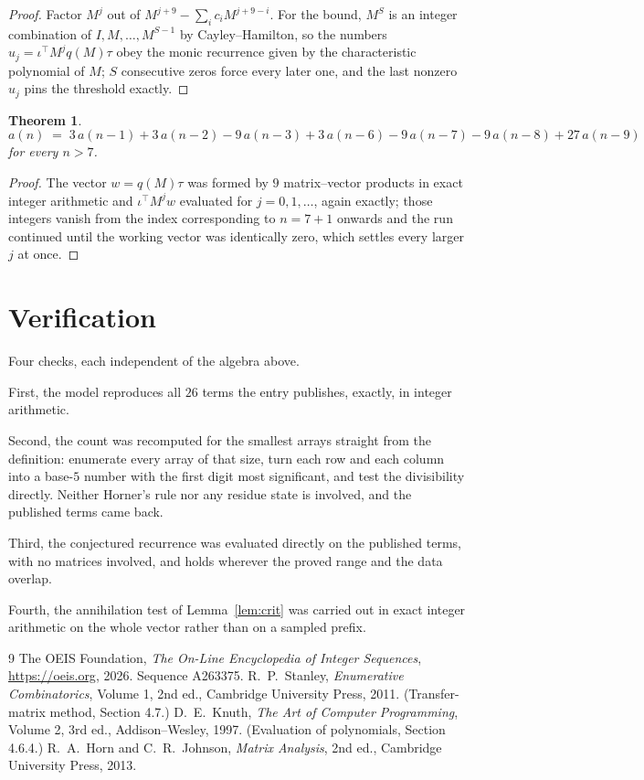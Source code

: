 \documentclass[11pt,a4paper]{article}
\theoremstyle{plain}
\newtheorem{theorem}{Theorem}
\theoremstyle{definition}
\begin{document}
\begin{proof}
Factor $M^{j}$ out of $M^{j+9}-\sum_ic_iM^{j+9-i}$. For the bound, $M^{S}$
is an integer combination of $I,M,\dots,M^{S-1}$ by Cayley--Hamilton, so the numbers
$u_j=\iota^{\!\top}M^{j}q(M)\tau$ obey the monic recurrence given by the characteristic
polynomial of $M$; $S$ consecutive zeros force every later one, and the last nonzero $u_j$
pins the threshold exactly.
\end{proof}

\begin{theorem}
\[
a(n)\;=\;3\,a(n-1) + 3\,a(n-2) - 9\,a(n-3) + 3\,a(n-6) - 9\,a(n-7) - 9\,a(n-8) + 27\,a(n-9)
\]
for every $n>7$.
\end{theorem}

\begin{proof}
The vector $w=q(M)\tau$ was formed by $9$ matrix--vector products in exact integer
arithmetic and $\iota^{\!\top}M^{j}w$ evaluated for $j=0,1,\dots$, again exactly; those
integers vanish from the index corresponding to $n=7+1$ onwards and the run continued
until the working vector was identically zero, which settles every larger $j$ at once.
\end{proof}

\section{Verification}

Four checks, each independent of the algebra above.

First, the model reproduces all $26$ terms the entry publishes, exactly, in integer
arithmetic.

Second, the count was recomputed for the smallest arrays straight from the definition:
enumerate every array of that size, turn each row and each column into a base-$5$ number with
the first digit most significant, and test the divisibility directly. Neither Horner's rule nor
any residue state is involved, and the published terms came back.

Third, the conjectured recurrence was evaluated directly on the published terms, with no
matrices involved, and holds wherever the proved range and the data overlap.

Fourth, the annihilation test of Lemma~\ref{lem:crit} was carried out in exact integer
arithmetic on the whole vector rather than on a sampled prefix.

\begin{thebibliography}{9}
 The OEIS Foundation, \emph{The On-Line Encyclopedia of Integer
Sequences}, \url{https://oeis.org}, 2026. Sequence A263375.
 R.~P.~Stanley, \emph{Enumerative Combinatorics}, Volume 1, 2nd ed.,
Cambridge University Press, 2011. (Transfer-matrix method, Section 4.7.)
 D.~E.~Knuth, \emph{The Art of Computer Programming}, Volume 2, 3rd ed.,
Addison--Wesley, 1997. (Evaluation of polynomials, Section 4.6.4.)
 R.~A.~Horn and C.~R.~Johnson, \emph{Matrix Analysis}, 2nd ed., Cambridge
University Press, 2013.
\end{thebibliography}
\end{document}
